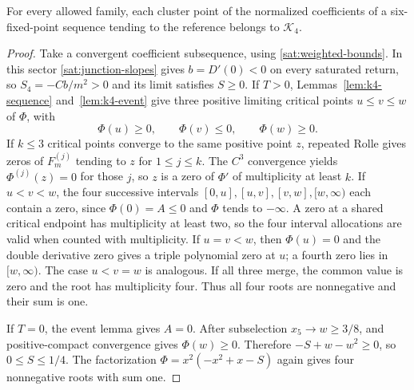 \begin{proposition}\label{prop:k4-necessary}
For every allowed family, each cluster point of the normalized
coefficients of a six-fixed-point sequence tending to the reference
belongs to $\mathcal K_4$.
\end{proposition}
\begin{proof}
Take a convergent coefficient subsequence, using \eqref{sat:weighted-bounds}.
In this sector \eqref{sat:junction-slopes} gives $b=D'(0)<0$ on every
saturated return, so $S_4=-Cb/m^2>0$ and its limit satisfies $S\ge0$.
If $T>0$, Lemmas~\ref{lem:k4-sequence} and~\ref{lem:k4-event} give three
positive limiting critical points $u\le v\le w$ of $\Phi$, with
\[
 \Phi(u)\ge0,\qquad\Phi(v)\le0,\qquad\Phi(w)\ge0.
\]
If $k\le3$ critical points converge to the same positive point $z$,
repeated Rolle gives zeros of $F_m^{(j)}$ tending to $z$ for
$1\le j\le k$. The $C^3$ convergence yields $\Phi^{(j)}(z)=0$ for
those $j$, so $z$ is a zero of $\Phi'$ of multiplicity at least $k$.
If $u<v<w$, the four successive intervals
$[0,u],[u,v],[v,w],[w,\infty)$ each contain a zero, since $\Phi(0)=A\le0$
and $\Phi$ tends to $-\infty$. A zero at a shared critical endpoint has
multiplicity at least two, so the four interval allocations are valid
when counted with multiplicity. If $u=v<w$, then $\Phi(u)=0$ and the
double derivative zero gives a triple polynomial zero at $u$; a fourth
zero lies in $[w,\infty)$. The case $u<v=w$ is analogous. If all three
merge, the common value is zero and the root has multiplicity four.
Thus all four roots are nonnegative and their sum is one.

If $T=0$, the event lemma gives $A=0$. After subselection $x_5\to w\ge3/8$,
and positive-compact convergence gives $\Phi(w)\ge0$. Therefore
$-S+w-w^2\ge0$, so $0\le S\le1/4$. The factorization
$\Phi=x^2(-x^2+x-S)$ again gives four nonnegative roots with sum one.
\end{proof}

